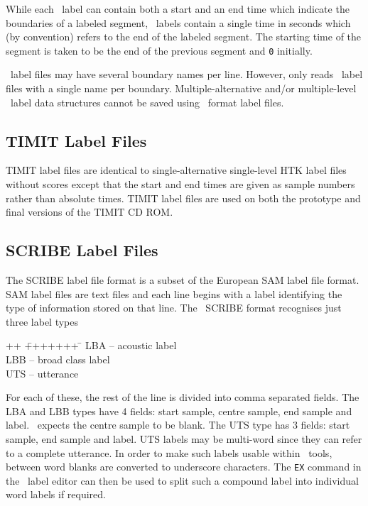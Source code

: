 While each \HTK\ label can contain both a start and an end time which
indicate
the boundaries of a labeled segment, \ESPSwaves\ labels
contain a single time in seconds which (by convention) refers 
to the end of the labeled segment.  The starting time
of the segment is taken to be the end of the previous
segment and \texttt{0} initially.

\ESPSwaves\  label files may have several boundary names per line.
However,  only reads \ESPSwaves\ label files with a single name
per boundary.  Multiple-alternative and/or multiple-level \HTK\ label
data structures cannot be saved using  \ESPSwaves\ format label files.

\subsection{TIMIT Label Files}

TIMIT label files are identical to single-alternative single-level HTK
label files without scores except that the start and end times are
given as sample numbers rather than absolute times.  TIMIT label files
are used on both the prototype and final versions of the TIMIT CD ROM.

\subsection{SCRIBE Label Files}

The SCRIBE label file format is a subset of the European SAM label file format.
SAM label files are text files and each line begins with a label identifying
the type of information stored on that line.  The \HTK\ SCRIBE format recognises
just three label types
\begin{tabbing}
++ \= +++++++ \= \kill
\> LBA \>-- acoustic label \\
\> LBB \>-- broad class label \\
\> UTS \>-- utterance 
\end{tabbing}
For each of these, the rest of the line is divided into comma separated
fields.  The LBA and LBB types have 4 fields: start sample, centre sample, end sample
and label.  \HTK\ expects the centre sample to be blank.  The UTS type has 3 fields:
start sample, end sample and label.  UTS labels may be multi-word since they can
refer to a complete utterance.  In order to make such labels usable within \HTK\ tools,
between word blanks are converted to underscore characters.  The 
\texttt{EX} command
in the \HTK\ label editor  can then be used to split such
a compound label into individual word labels if required.


